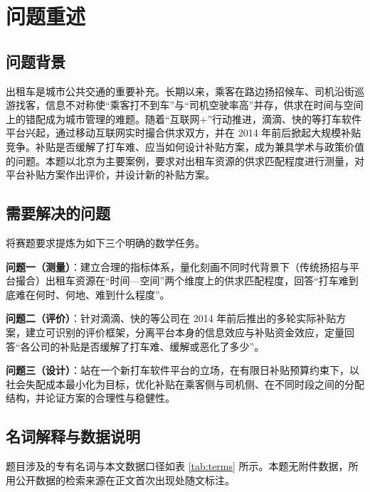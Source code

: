 \documentclass[12pt,a4paper]{ctexart}
\begin{document}
\section{问题重述}

\subsection{问题背景}

出租车是城市公共交通的重要补充。长期以来，乘客在路边扬招候车、司机沿街巡游找客，信息不对称使“乘客打不到车”与“司机空驶率高”并存，供求在时间与空间上的错配成为城市管理的难题。随着“互联网+”行动推进，滴滴、快的等打车软件平台兴起，通过移动互联网实时撮合供求双方，并在 2014 年前后掀起大规模补贴竞争。补贴是否缓解了打车难、应当如何设计补贴方案，成为兼具学术与政策价值的问题。本题以北京为主要案例，要求对出租车资源的供求匹配程度进行测量，对平台补贴方案作出评价，并设计新的补贴方案。

\subsection{需要解决的问题}

将赛题要求提炼为如下三个明确的数学任务。

\textbf{问题一（测量）}：建立合理的指标体系，量化刻画不同时代背景下（传统扬招与平台撮合）出租车资源在“时间—空间”两个维度上的供求匹配程度，回答“打车难到底难在何时、何地、难到什么程度”。

\textbf{问题二（评价）}：针对滴滴、快的等公司在 2014 年前后推出的多轮实际补贴方案，建立可识别的评价框架，分离平台本身的信息效应与补贴资金效应，定量回答“各公司的补贴是否缓解了打车难、缓解或恶化了多少”。

\textbf{问题三（设计）}：站在一个新打车软件平台的立场，在有限日补贴预算约束下，以社会失配成本最小化为目标，优化补贴在乘客侧与司机侧、在不同时段之间的分配结构，并论证方案的合理性与稳健性。

\subsection{名词解释与数据说明}

题目涉及的专有名词与本文数据口径如表 \ref{tab:terms} 所示。本题无附件数据，所用公开数据的检索来源在正文首次出现处随文标注。
\end{document}
